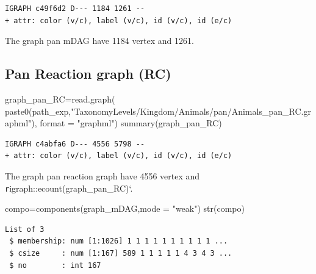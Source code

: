 \documentclass[
  letterpaper,
  DIV=11,
  numbers=noendperiod]{scrreprt}
\newenvironment{Shaded}{\begin{snugshade}}{\end{snugshade}}
\newcommand{\AttributeTok}[1]{\textcolor[rgb]{0.40,0.45,0.13}{#1}}
\newcommand{\FunctionTok}[1]{\textcolor[rgb]{0.28,0.35,0.67}{#1}}
\newcommand{\NormalTok}[1]{\textcolor[rgb]{0.00,0.23,0.31}{#1}}
\newcommand{\OtherTok}[1]{\textcolor[rgb]{0.00,0.23,0.31}{#1}}
\newcommand{\SpecialCharTok}[1]{\textcolor[rgb]{0.37,0.37,0.37}{#1}}
\newcommand{\StringTok}[1]{\textcolor[rgb]{0.13,0.47,0.30}{#1}}
\begin{document}
\begin{verbatim}
IGRAPH c49f6d2 D--- 1184 1261 -- 
+ attr: color (v/c), label (v/c), id (v/c), id (e/c)
\end{verbatim}

The graph pan mDAG have 1184 vertex and 1261.

\hypertarget{pan-reaction-graph-rc}{%
\subsection*{Pan Reaction graph (RC)}\label{pan-reaction-graph-rc}}

\begin{Shaded}
\begin{Highlighting}[]
\NormalTok{graph\_pan\_RC}\OtherTok{=}\FunctionTok{read.graph}\NormalTok{(}
  \FunctionTok{paste0}\NormalTok{(path\_exp,}\StringTok{"TaxonomyLevels/Kingdom/Animals/pan/Animals\_pan\_RC.graphml"}\NormalTok{), }\AttributeTok{format =} \StringTok{"graphml"}\NormalTok{)}
\FunctionTok{summary}\NormalTok{(graph\_pan\_RC)}
\end{Highlighting}
\end{Shaded}

\begin{verbatim}
IGRAPH c4abfa6 D--- 4556 5798 -- 
+ attr: color (v/c), label (v/c), id (v/c), id (e/c)
\end{verbatim}

The graph pan reaction graph have 4556 vertex and
\texttt{r}igraph::ecount(graph\_pan\_RC)`.

\begin{Shaded}
\begin{Highlighting}[]
\NormalTok{compo}\OtherTok{=}\FunctionTok{components}\NormalTok{(graph\_mDAG,}\AttributeTok{mode =} \StringTok{"weak"}\NormalTok{)}
\FunctionTok{str}\NormalTok{(compo)}
\end{Highlighting}
\end{Shaded}

\begin{verbatim}
List of 3
 $ membership: num [1:1026] 1 1 1 1 1 1 1 1 1 1 ...
 $ csize     : num [1:167] 589 1 1 1 1 1 4 3 4 3 ...
 $ no        : int 167
\end{verbatim}

\begin{Shaded}
\end{Shaded}
\end{document}
